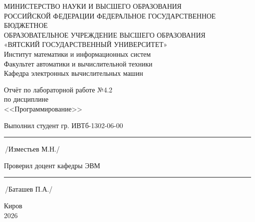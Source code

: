 \documentclass[oneside,a4paper,14pt]{extarticle}
\begin{document}
    \newpage\thispagestyle{empty}
    \begin{center}
        МИНИСТЕРСТВО НАУКИ И ВЫСШЕГО ОБРАЗОВАНИЯ\\
            РОССИЙСКОЙ ФЕДЕРАЦИИ
            ФЕДЕРАЛЬНОЕ ГОСУДАРСТВЕННОЕ БЮДЖЕТНОЕ\\
            ОБРАЗОВАТЕЛЬНОЕ
            УЧРЕЖДЕНИЕ ВЫСШЕГО ОБРАЗОВАНИЯ\\
            «ВЯТСКИЙ ГОСУДАРСТВЕННЫЙ УНИВЕРСИТЕТ»\\
            Институт математики и информационных систем\\
            Факультет автоматики и вычислительной техники\\
            Кафедра электронных вычислительных машин
    \end{center}
    \vspace{20mm}

    \begin{center}
        Отчёт по лабораторной работе №4.2\\
        по дисциплине\\
        <<Программирование>>\\
    \end{center}
    \vspace{48mm}

    Выполнил студент гр. ИВТб-1302-06-00 \hspace{10mm} \rule[-0,5mm]{30mm}{0.15mm}\,/Изместьев М.Н./


    Проверил доцент кафедры ЭВМ \hfill  \rule[-0,5mm]{30mm}{0.15mm}\,/Баташев П.А./

    \vfill
    \begin{center}
        Киров\\
        2026
    \end{center}

    \newpage\thispagestyle{empty}
\end{document}
